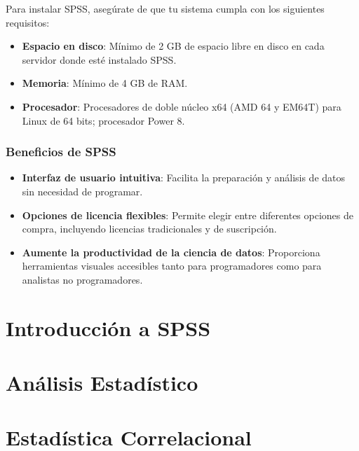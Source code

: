 \documentclass[
  letterpaper,
  DIV=11,
  numbers=noendperiod]{scrreprt}
\begin{document}
Para instalar SPSS, asegúrate de que tu sistema cumpla con los
siguientes requisitos:

\begin{itemize}
\item
  \textbf{Espacio en disco}: Mínimo de 2 GB de espacio libre en disco en
  cada servidor donde esté instalado SPSS.
\item
  \textbf{Memoria}: Mínimo de 4 GB de RAM.
\item
  \textbf{Procesador}: Procesadores de doble núcleo x64 (AMD 64 y EM64T)
  para Linux de 64 bits; procesador Power 8.
\end{itemize}

\subsection*{Beneficios de SPSS}\label{beneficios-de-spss}

\begin{itemize}
\item
  \textbf{Interfaz de usuario intuitiva}: Facilita la preparación y
  análisis de datos sin necesidad de programar.
\item
  \textbf{Opciones de licencia flexibles}: Permite elegir entre
  diferentes opciones de compra, incluyendo licencias tradicionales y de
  suscripción.
\item
  \textbf{Aumente la productividad de la ciencia de datos}: Proporciona
  herramientas visuales accesibles tanto para programadores como para
  analistas no programadores.
\end{itemize}


\chapter{Introducción a SPSS}\label{introducciuxf3n-a-spss}


\chapter{Análisis Estadístico}\label{anuxe1lisis-estaduxedstico}


\chapter{Estadística Correlacional}\label{estaduxedstica-correlacional}
\end{document}
